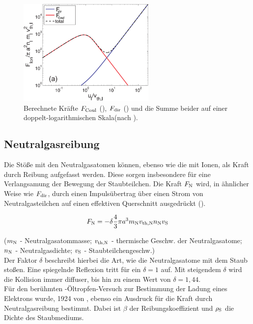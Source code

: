         \begin{figure}[!t]
          \centering
          \includegraphics[height=0.4\textwidth,width=0.6\textwidth]{figs/forcesandtrappingmelzer.png}
          \caption{Berechnete Kräfte $F_\text{Coul}$ (), $F_\text{dir}$ () und die Summe beider auf einer doppelt-logarithmischen Skala(nach \cite{Melzer12}).}
          \label{img:ionkräfte}
        \end{figure}

  \subsection{Neutralgasreibung}

    Die Stöße mit den Neutralgasatomen können, ebenso wie die mit Ionen, als Kraft durch Reibung aufgefasst werden. Diese sorgen insbesondere für eine Verlangsamung der Bewegung der Staubteilchen. Die Kraft $F_\text{N}$ wird, in ähnlicher Weise wie $F_\text{dir}$, durch einen Impulsübertrag über einen Strom von Neutralgasteilchen auf einen effektiven Querschnitt ausgedrückt (\cite{Epstein24}).

      \begin{align}
        F_\text{N}=-\delta\frac{4}{3}\pi a^3m_\text{N}v_\text{th,N}n_\text{N}v_\text{S}
      \end{align}

    ($m_\text{N}$ - Neutralgasatommasse; $v_\text{th,N}$ - thermische Geschw. der Neutralgasatome; $n_\text{N}$ - Neutralgasdichte; $v_\text{S}$ - Staubteilchengeschw.)\\
    Der Faktor $\delta$ beschreibt hierbei die Art, wie die Neutralgasatome mit dem Staub stoßen. Eine spiegelnde Reflexion tritt für ein $\delta=1$ auf. Mit steigendem $\delta$ wird die Kollision immer diffuser, bis hin zu einem Wert von $\delta=1,44$.\\
    Für den berühmten -Öltropfen-Versuch zur Bestimmung der Ladung eines Elektrons wurde, 1924 von , ebenso ein Ausdruck für die Kraft durch Neutralgasreibung bestimmt. Dabei ist $\beta$ der Reibungskoeffizient und $\rho_\text{S}$ die Dichte des Staubmediums.

